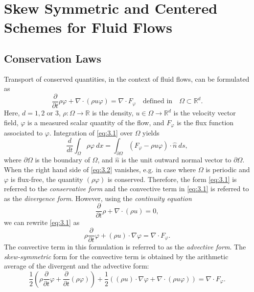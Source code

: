 \section{Skew Symmetric and Centered Schemes for Fluid Flows} \label{sec:skew}

\subsection{Conservation Laws} \label{sec:skew.1}
Transport of conserved quantities, in the context of fluid flows, can be formulated as
\begin{equation} \label{eq:3.1}
	\frac{\partial }{\partial t} \rho \varphi + \nabla \cdot ( \rho u \varphi  ) = \nabla \cdot F_{\varphi}\quad \text{defined in} \quad \Omega \subset \mathbb R^{d}.
\end{equation}
Here, $d = 1,2$ or $3$, $\rho:\Omega\to \mathbb R$ is the density, $u\in \Omega \to \mathbb R^{d}$ is the velocity vector field, $\varphi$ is a measured scalar quantity of the flow, and $F_{\varphi}$ is the flux function associated to $\varphi$. Integration of \eqref{eq:3.1} over $ \Omega$ yields
\begin{equation} \label{eq:3.2}
	\frac{d}{dt} \int_{\Omega} \rho \varphi \ dx = \int_{\partial \Omega} (F_{\varphi} - \rho u \varphi) \cdot \hat n\ ds,
\end{equation}
where $\partial \Omega$ is the boundary of $\Omega$, and $\hat n$ is the unit outward normal vector to $\partial \Omega$. When the right hand side of \eqref{eq:3.2} vanishes, e.g. in case where $\Omega$ is periodic and $\varphi$ is flux-free, the quantity $(\rho \varphi)$ is conserved. Therefore, the form \eqref{eq:3.1} is referred to the \emph{conservative form} and the convective term in \eqref{eq:3.1} is referred to as the \emph{divergence form}. However, using the \emph{continuity equation}
\begin{equation} \label{eq:3.3}
	\frac{\partial }{\partial t} \rho + \nabla \cdot (\rho u) = 0,
\end{equation}
we can rewrite \eqref{eq:3.1} as
\begin{equation} \label{eq:3.4}
	\rho \frac{\partial }{\partial t} \varphi + (\rho u)\cdot \nabla \varphi = \nabla \cdot F_{\varphi}.
\end{equation}
The convective term in this formulation is referred to as the \emph{advective form}. The \emph{skew-symmetric} form for the convective term is obtained by the arithmetic average of the divergent and the advective form:
\begin{equation} \label{eq:3.5}
	\frac{1}{2} \left( \rho \frac{\partial }{\partial t} \varphi + \frac{\partial }{\partial t} (\rho \varphi) \right) + \frac 1 2 \left( (\rho u)\cdot \nabla \varphi + \nabla \cdot (\rho u \varphi) \right) = \nabla \cdot F_{\varphi}.
\end{equation}
